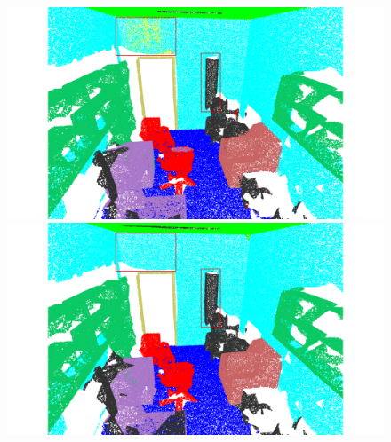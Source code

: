 \begin{figure}[htbp]
\begin{minipage}{0.17\textwidth}
    \end{minipage}
    \hfill
    \begin{minipage}{0.17\textwidth}
        \centering
        \includegraphics[width=\textwidth]{fig/supplement/semantic_segmentation/office_9/PLT_office_9.pdf}
    \end{minipage}
    \hfill
    \begin{minipage}{0.17\textwidth}
        \centering
        \includegraphics[width=\textwidth]{fig/supplement/semantic_segmentation/office_9/GT_office_9.pdf}
    \end{minipage}
    \hfill

    \vspace{0.5em}


\end{figure}
